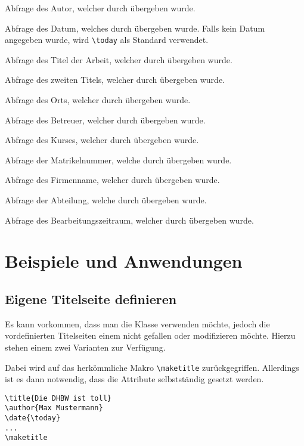 \documentclass[babel=ngerman,highlight=false]{skdoc}
\begin{document}
            \DescribeMacro\getAuthor Abfrage des Autor, welcher durch  übergeben wurde.
            
            \DescribeMacro\getDate Abfrage des Datum, welches durch  übergeben wurde. Falls kein Datum angegeben wurde, wird \verb|\today| als Standard verwendet.
            
            \DescribeMacro\getThesisTitle Abfrage des Titel der Arbeit, welcher durch  übergeben wurde.
            
            \DescribeMacro\getThesisSecondTitle Abfrage des zweiten Titels, welcher durch  übergeben wurde.
            
            \DescribeMacro\getLocation Abfrage des Orts, welcher durch  übergeben wurde.
            
            \DescribeMacro\getSupervisor Abfrage des Betreuer, welcher durch  übergeben wurde.
            
            \DescribeMacro\getCourse Abfrage des Kurses, welcher durch  übergeben wurde.
            
            \DescribeMacro\getStudentId Abfrage der Matrikelnummer, welche durch  übergeben wurde.
            
            \DescribeMacro\getInstitute Abfrage des Firmenname, welcher durch  übergeben wurde.
            
            \DescribeMacro\getInstituteSection Abfrage der Abteilung, welche durch  übergeben wurde.
            
            \DescribeMacro\getProcessingPeriod Abfrage des Bearbeitungszeitraum, welcher durch  übergeben wurde.
            
    \section{Beispiele und Anwendungen}
        \subsection{Eigene Titelseite definieren}
            Es kann vorkommen, dass man die Klasse verwenden möchte, jedoch die vordefinierten Titelseiten einem nicht gefallen oder modifizieren möchte. Hierzu stehen einem zwei Varianten zur Verfügung.
            
            Dabei wird auf das herkömmliche Makro \verb|\maketitle| zurückgegriffen. Allerdings ist es dann notwendig, dass die Attribute selbstständig gesetzt werden.
            \begin{verbatim}
\title{Die DHBW ist toll}
\author{Max Mustermann}
\date{\today}
...
\maketitle
            \end{verbatim}
            
\end{document}
